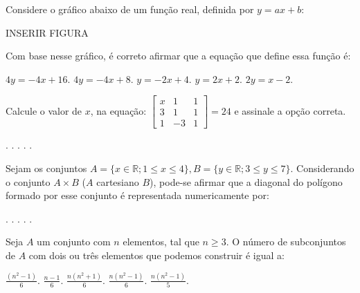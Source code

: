 \begin{question}%
Considere o gráfico abaixo de um função real, definida por \(y= ax + b\):

INSERIR FIGURA

Com base nesse gráfico, é correto afirmar que a equação que define essa função é:
    \begin{tasks}
        \task \(4y = -4x + 16\).
        \task \(4y = -4x + 8\).
        \task \(y = -2x + 4\).
        \task \(y= 2x + 2\).
        \task \(2y = x-2\).
    \end{tasks}
\end{question}

\begin{question}%
Calcule o valor de \(x\), na equação: 
\(\begin{bmatrix}
x & 1  & 1\\
3 & 1 & 1\\
1 & -3 & 1
\end{bmatrix}
=24 \) e assinale a opção correta.
    \begin{tasks}
        .
        .
        .
        .
        .
    \end{tasks}
\end{question}

\begin{question}%
Sejam os conjuntos \(A=\{x \in \mathbb{R}; 1 \leq x \leq 4\}, B = \{ y \in \mathbb{R}; 3 \leq y \leq 7\}\). Considerando o conjunto \(A \times B\) (\(A\) cartesiano \(B\)), pode-se afirmar que a diagonal do polígono formado por esse conjunto é representada numericamente por:
    \begin{tasks}
        .
        .
        .
        .
        .
    \end{tasks}
\end{question}

\begin{question}%
Seja \(A\) um conjunto com \(n\) elementos, tal que \(n \geq 3\). O número de subconjuntos de \(A\) com dois ou três elementos que podemos construir é igual a:
    \begin{tasks}
        \task \(\frac{(n^2-1)}{6}\).
        \task \(\frac{n-1}{6}\).
        \task \(\frac{n(n^2+1)}{6}\).
        \task \(\frac{n(n^2-1)}{6}\).
        \task \(\frac{n(n^2-1)}{5}\).
    \end{tasks}
\end{question}

